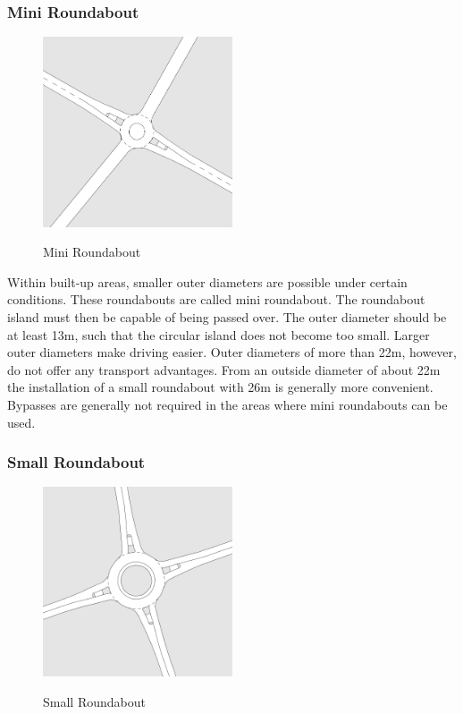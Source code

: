 \subsubsection{Mini Roundabout}
\label{mini_roundabout}
\begin{figure}[!ht]
\caption{Mini Roundabout \cite{man06}}
\includegraphics[width=0.5\textwidth]{bilder/mini_roundabout.png} %
\label{roundabout_mini}
\end{figure}

Within built-up areas, smaller outer diameters are possible under certain conditions.
These roundabouts are called mini roundabout. The roundabout island must then be capable of being passed over.
The outer diameter should be at least 13m, such that the circular island does not become too small.
Larger outer diameters make driving easier. Outer diameters of more than 22m, however, do not offer any transport advantages.
From an outside diameter of about 22m the installation of a small roundabout with 26m is generally more convenient.
Bypasses are generally not required in the areas where mini roundabouts can be used.\cite{man06}


\subsubsection{Small Roundabout}
\label{smal_roundabout}

\begin{figure}[!ht]
\caption{Small Roundabout \cite{man06}}
\includegraphics[width=0.5\textwidth]{bilder/small_roundabout.png} %
\label{roundabout_small}
\end{figure}

